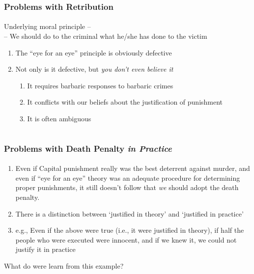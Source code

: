\documentclass{beamer}
\begin{document}
\begin{frame}
    \frametitle{Problems with Retribution}
    \framesubtitle{}

Underlying moral principle -- \\
-- We should do to the criminal what he/she has done to the victim

\begin{enumerate}
\item The ``eye for an eye'' principle is obviously defective
\item Not only is it defective, but \emph{you don't even believe it}
\begin{enumerate}
\item It requires barbaric responses to barbaric crimes
\item It conflicts with our beliefs about the justification of punishment
\item It is often ambiguous
\end{enumerate}

\end{enumerate}



\end{frame}


\section{}

\begin{frame}
    \frametitle{Problems with Death Penalty \emph{in Practice}}
    \framesubtitle{}

\begin{enumerate}
\item Even if Capital punishment really was the best deterrent against 
murder, and even if ``eye for an eye'' theory was an adequate procedure 
for determining proper punishments, it still doesn't follow that 
\emph{we} should adopt the death penalty.
\item There is a distinction between `justified in theory' and 
`justified in practice'
\item e.g., Even if the above were true (i.e., it were justified in 
theory), if 
half the people who were executed were innocent, and if we knew it, we 
could not justify it in practice
\pause

\end{enumerate}

What do were learn from this example?

\end{frame}
\end{document}
